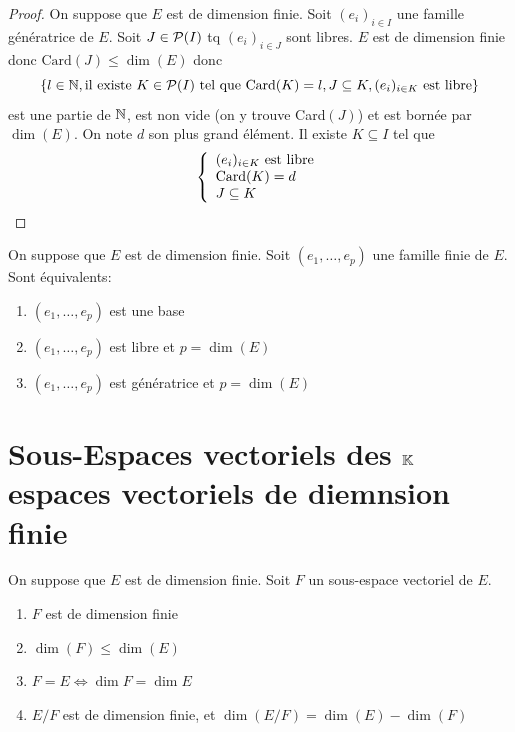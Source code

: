 \documentclass[]{report}
\begin{document}
\begin{proof}
    On suppose que $E$ est de dimension finie. Soit $(e_i)_{i\in I}$ une famille génératrice de $E$. Soit $J\in \mathcal{P} (I)$ tq $(e_i)_{i\in J}$ sont libres. $E$ est de dimension finie donc $\text{Card} (J)\le \dim (E)$ donc
    \[\{l\in \mathbb{N},\text{il existe $K\in \mathcal{P}(I)$ tel que $\text{Card}(K)=l$},J\subseteq K,(e_i)_{i \in K}\text{ est libre}\}\]
    est une partie de $\mathbb{N}$, est non vide (on y trouve Card$(J)$) et est bornée par $\dim (E)$. On note $d$ son plus grand élément. Il existe $K\subseteq I$ tel que
    \[\left\{\begin{array}{ll} (e_i)_{i\in K}\text{ est libre}\\ \text{Card}(K)=d\\ J\subseteq K \end{array} \right.\]
\end{proof}

\begin{cor}{}{}
    On suppose que $E$ est de dimension finie. Soit $(e_1,\ldots,e_p)$ une famille finie de $E$. Sont équivalents:
    \begin{enumerate}
        \item $(e_1,\ldots,e_p)$ est une base
        \item $(e_1,\ldots,e_p)$ est libre et $p=\dim (E)$
        \item $(e_1,\ldots,e_p)$ est génératrice et $p=\dim(E)$
    \end{enumerate}
\end{cor}

\section{Sous-Espaces vectoriels des $\mathbb{K}$ espaces vectoriels de diemnsion finie}

\begin{prop}{}{}
    On suppose que $E$ est de dimension finie. Soit $F$ un sous-espace vectoriel de $E$.
    \begin{enumerate}
        \item $F$ est de dimension finie
        \item $\dim(F)\le \dim(E)$
        \item $F=E\iff \dim F=\dim E$
        \item $E/F$ est de dimension finie, et $\dim(E/F)=\dim (E)-\dim (F)$
    \end{enumerate}
\end{prop}
\end{document}
